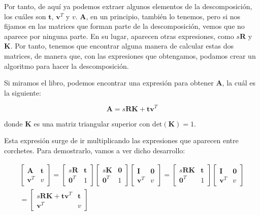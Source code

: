 \documentclass[11pt,a4paper]{article}
\begin{document}
Por tanto, de aquí ya podemos extraer algunos elementos de la descomposición,
los cuáles son $\mathbf{t}$, $\mathbf{v}^T$ y $v$. $\mathbf{A}$, en un principio, también
lo tenemos, pero si nos fijamos en las matrices que forman parte de la descomposición,
vemos que no aparece por ninguna parte. En su lugar, aparecen otras expresiones, como
$s\mathbf{R}$ y $\mathbf{K}$. Por tanto, tenemos que encontrar alguna manera
de calcular estas dos matrices, de manera que, con las expresiones que obtengamos,
podamos crear un algoritmo para hacer la descomposición.

Si miramos el libro, podemos encontrar
una expresión para obtener $\mathbf{A}$, la cuál es la siguiente:

\begin{equation}
\label{dec}
	\mathbf{A} = s\mathbf{RK} + \mathbf{tv}^T
\end{equation}

\noindent donde $\mathbf{K}$ es una matriz triangular superior con $\text{det}(\mathbf{K})=1$.

Esta expresión surge de ir multiplicando las expresiones que aparecen
entre corchetes. Para demostrarlo, vamos a ver dicho desarrollo:

\begin{gather*}
\begin{bmatrix} \mathbf{A} & \mathbf{t} \\ \mathbf{v}^T & v
\end{bmatrix} =
\begin{bmatrix} s\mathbf{R} & \mathbf{t} \\ \mathbf{0}^T & 1 \end{bmatrix}
\begin{bmatrix} s\mathbf{K} & \mathbf{0} \\ \mathbf{0}^T & 1 \end{bmatrix}
\begin{bmatrix} \mathbf{I} & \mathbf{0} \\ \mathbf{v}^T & v \end{bmatrix}
=
\begin{bmatrix} s\mathbf{RK} & \mathbf{t} \\ \mathbf{0}^T & 1 \end{bmatrix}
\begin{bmatrix} \mathbf{I} & \mathbf{0} \\ \mathbf{v}^T & v \end{bmatrix}
\\ =
\begin{bmatrix} s\mathbf{RK} + \mathbf{tv}^T & \mathbf{t} \\ \mathbf{v}^T & v \end{bmatrix}
\end{gather*}
\end{document}
